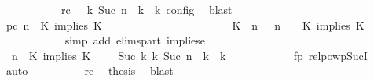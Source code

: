 \begin{isabellebody}
\ \ \ \ \ \ \ \ \ \ \ rc{\isacharcolon}{\isacartoucheopen}{\isasymrho}\ {\isasymin}\ {\isasymlbrakk}\ {\isasymGamma}\isactrlsub k{\isacharcomma}\ Suc\ n\ {\isasymturnstile}\ {\isasymPsi}\isactrlsub k\ {\isasymtriangleright}\ {\isasymPhi}\isactrlsub k\ {\isasymrbrakk}\isactrlsub c\isactrlsub o\isactrlsub n\isactrlsub f\isactrlsub i\isactrlsub g{\isacartoucheclose}\ \isamarkupfalse%
\ blast\isanewline
\ \ \ \ \ \ \ \ \isamarkupfalse%
\ pc{\isacharcolon}{\isacartoucheopen}{\isacharparenleft}{\isasymGamma}{\isacharcomma}\ n\ {\isasymturnstile}\ {\isacharparenleft}K\ implies\ K\ {\isacharhash}\ {\isasymPsi}\ {\isasymtriangleright}\ {\isasymPhi}{\isacharparenright}\isanewline
\ \ \ \ \ \ \ \ \ \ \ \ \ \ \ \ \ \ {\isasymhookrightarrow}\ {\isacharparenleft}{\isacharparenleft}{\isacharparenleft}K\ {\isasymnot}{\isasymUp}\ n{\isacharparenright}\ {\isacharhash}\ {\isasymGamma}{\isacharparenright}{\isacharcomma}\ n\ {\isasymturnstile}\ {\isasymPsi}\ {\isasymtriangleright}\ {\isacharparenleft}{\isacharparenleft}K\ implies\ K\ {\isacharhash}\ {\isasymPhi}{\isacharparenright}{\isacharparenright}{\isacartoucheclose}\isanewline
\ \ \ \ \ \ \ \ \ \ \isamarkupfalse%
\ {\isacharparenleft}simp\ add{\isacharcolon}\ elims{\isacharunderscore}part\ implies{\isacharunderscore}e{}{\isacharparenright}\isanewline
\ \ \ \ \ \ \ \ \isamarkupfalse%
\ {\isacartoucheopen}{\isacharparenleft}{\isasymGamma}{\isacharcomma}\ n\ {\isasymturnstile}\ {\isacharparenleft}K\ implies\ K\ {\isacharhash}\ {\isasymPsi}\ {\isasymtriangleright}\ {\isasymPhi}{\isacharparenright}\ {\isasymhookrightarrow}\isactrlbsup Suc\ k\isactrlesup \ {\isacharparenleft}{\isasymGamma}\isactrlsub k{\isacharcomma}\ Suc\ n\ {\isasymturnstile}\ {\isasymPsi}\isactrlsub k\ {\isasymtriangleright}\ {\isasymPhi}\isactrlsub k{\isacharparenright}{\isacartoucheclose}\isanewline
\ \ \ \ \ \ \ \ \ \ \isamarkupfalse%
\ fp\ relpowp{\isacharunderscore}Suc{\isacharunderscore}I{}\ \isamarkupfalse%
\ auto\isanewline
\ \ \ \ \ \ \ \ \isamarkupfalse%
\ rc\ \isamarkupfalse%
\ {\isacharquery}thesis\ \isamarkupfalse%
\ blast\isanewline
\ \ \ \ \ \ \isamarkupfalse%
\isanewline
\ \ \ \ \ \ \isamarkupfalse%

\end{isabellebody}
